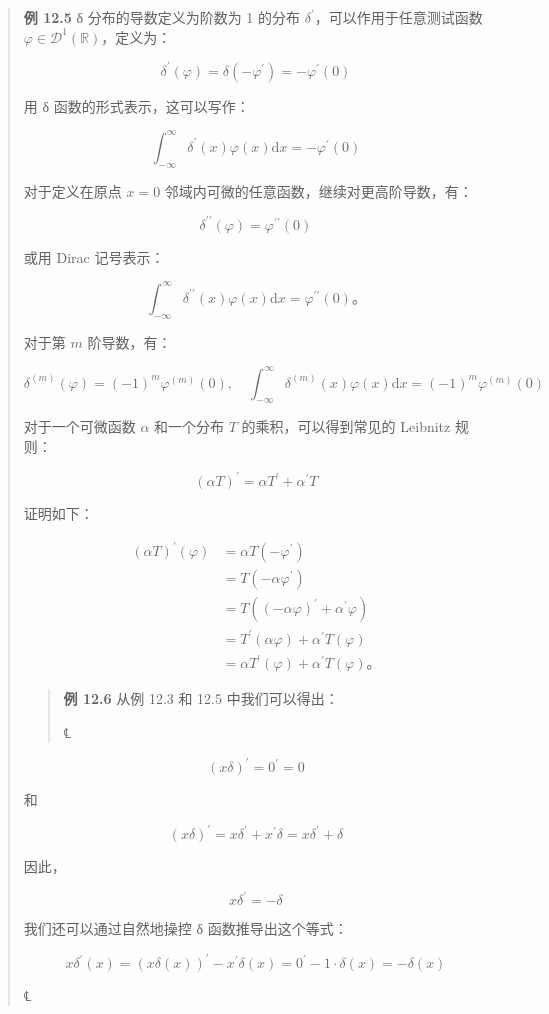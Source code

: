 \begin{quote}
\textbf{例 12.5} δ 分布的导数定义为阶数为 1 的分布
\(\delta^{\prime}\)，可以作用于任意测试函数
\(\varphi \in \mathcal{D}^{1}\left( \mathbb{R} \right)\)，定义为：

\[\delta^{\prime}(\varphi) = \delta\left( - \varphi^{\prime} \right) = - \varphi^{\prime}(0)\]

用 δ 函数的形式表示，这可以写作：

\[\int_{- \infty}^{\infty}\delta^{\prime}(x)\varphi(x)\mathrm{d}x = - \varphi^{\prime}(0)\]

对于定义在原点 \(x = 0\) 邻域内可微的任意函数，继续对更高阶导数，有：

\[\delta^{\prime\prime}(\varphi) = \varphi^{\prime\prime}(0)\]

或用 Dirac 记号表示：

\[\int_{- \infty}^{\infty}\delta^{\prime\prime}(x)\varphi(x)\mathrm{d}x = \varphi^{\prime\prime}(0)。\]

对于第 \(m\) 阶导数，有：

\[\delta^{(m)}(\varphi) = ( - 1)^{m}\varphi^{(m)}(0),\quad\int_{- \infty}^{\infty}\delta^{(m)}(x)\varphi(x)\mathrm{d}x = ( - 1)^{m}\varphi^{(m)}(0)\]

对于一个可微函数 \(\alpha\) 和一个分布 \(T\) 的乘积，可以得到常见的
Leibnitz 规则：

\[(\alpha T)^{\prime} = \alpha T^{\prime} + \alpha^{\prime}T\]

证明如下：

\[\begin{aligned}
(\alpha T)^{\prime}(\varphi) & = \alpha T\left( - \varphi^{\prime} \right) \\
 & = T\left( - \alpha\varphi^{\prime} \right) \\
 & = T\left( ( - \alpha\varphi)^{\prime} + \alpha^{\prime}\varphi \right) \\
 & = T^{\prime}(\alpha\varphi) + \alpha^{\prime}T(\varphi) \\
 & = \alpha T^{\prime}(\varphi) + \alpha^{\prime}T(\varphi)。
\end{aligned}\]

\begin{quote}
\textbf{例 12.6} 从例 12.3 和 12.5 中我们可以得出：

℄~
\end{quote}

\[(x\delta)^{\prime} = 0^{\prime} = 0\]

和

\[(x\delta)^{\prime} = x\delta^{\prime} + x^{\prime}\delta = x\delta^{\prime} + \delta\]

因此，

\[x\delta^{\prime} = - \delta\]

我们还可以通过自然地操控 δ 函数推导出这个等式：

\[x\delta^{\prime}(x) = \left( x\delta(x) \right)^{\prime} - x^{\prime}\delta(x) = 0^{\prime} - 1 \cdot \delta(x) = - \delta(x)\]

℄~
\end{quote}

